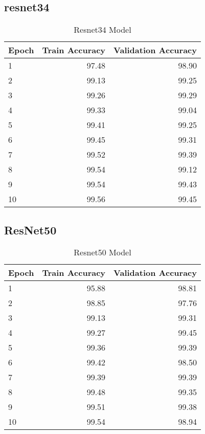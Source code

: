 \documentclass[a4paper,11pt,titlepage]{jsarticle}
\begin{document}
\subsection{resnet34}
\begin{table}[H]
\centering
\caption{Resnet34 Model}
\label{tab:Resnet34}
\begin{tabular}{lrr}
\hline
  Epoch &   Train Accuracy &   Validation Accuracy \\
\hline
      1 &             97.48 &                  98.90 \\
      2 &             99.13 &                  99.25 \\
      3 &             99.26 &                  99.29 \\
      4 &             99.33 &                  99.04 \\
      5 &             99.41 &                  99.25 \\
      6 &             99.45 &                  99.31 \\
      7 &             99.52 &                  99.39 \\
      8 &             99.54 &                  99.12 \\
      9 &             99.54 &                  99.43 \\
     10 &             99.56 &                  99.45 \\
\hline
\end{tabular}
\end{table}


\subsection{ResNet50}
\begin{table}[H]
\centering
\caption{Resnet50 Model}
\label{tab:Resnet50}
\begin{tabular}{lrr}
\hline
  Epoch &   Train Accuracy &   Validation Accuracy \\
\hline
      1 &             95.88 &                  98.81 \\
      2 &             98.85 &                  97.76 \\
      3 &             99.13 &                  99.31 \\
      4 &             99.27 &                  99.45 \\
      5 &             99.36 &                  99.39 \\
      6 &             99.42 &                  98.50 \\
      7 &             99.39 &                  99.39 \\
      8 &             99.48 &                  99.35 \\
      9 &             99.51 &                  99.38 \\
     10 &             99.54 &                  98.94 \\
\hline
\end{tabular}
\end{table}
\end{document}
